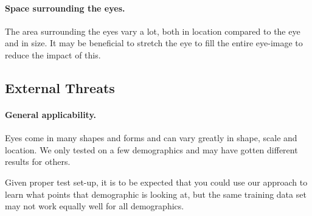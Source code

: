 \paragraph{Space surrounding the eyes.}
The area surrounding the eyes vary a lot, both in location compared to the eye and in size. 
It may be beneficial to stretch the eye to fill the entire eye-image to reduce the impact of this.

\subsection{External Threats}
\paragraph{General applicability.}
Eyes come in many shapes and forms and can vary greatly in shape, scale and location.
We only tested on a few demographics and may have gotten different results for others.

Given proper test set-up, it is to be expected that you could use our approach to learn what points that demographic is looking at, but the same training data set may not work equally well for all demographics.
